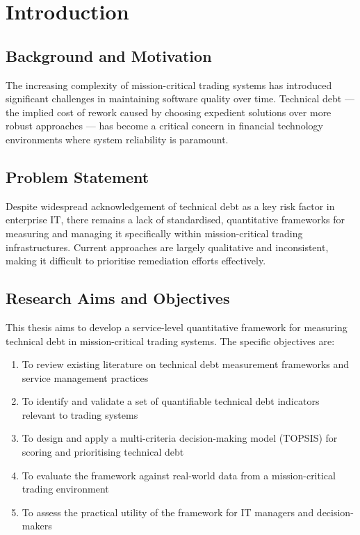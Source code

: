 \documentclass[
  11pt,
  letterpaper,
  11pt,
  english,
  onehalfspacing,
  headsepline]{MastersDoctoralThesis}
\providecommand{\tightlist}{%
  \setlength{\itemsep}{0pt}\setlength{\parskip}{0pt}}
\begin{document}

\chapter{Introduction}\label{introduction}

\section{Background and Motivation}\label{background-and-motivation}

The increasing complexity of mission-critical trading systems has
introduced significant challenges in maintaining software quality over
time. Technical debt --- the implied cost of rework caused by choosing
expedient solutions over more robust approaches --- has become a
critical concern in financial technology environments where system
reliability is paramount.

\section{Problem Statement}\label{problem-statement}

Despite widespread acknowledgement of technical debt as a key risk
factor in enterprise IT, there remains a lack of standardised,
quantitative frameworks for measuring and managing it specifically
within mission-critical trading infrastructures. Current approaches are
largely qualitative and inconsistent, making it difficult to prioritise
remediation efforts effectively.

\section{Research Aims and
Objectives}\label{research-aims-and-objectives}

This thesis aims to develop a service-level quantitative framework for
measuring technical debt in mission-critical trading systems. The
specific objectives are:

\begin{enumerate}
\def\labelenumi{\arabic{enumi}.}
\tightlist
\item
  To review existing literature on technical debt measurement frameworks
  and service management practices
\item
  To identify and validate a set of quantifiable technical debt
  indicators relevant to trading systems
\item
  To design and apply a multi-criteria decision-making model (TOPSIS)
  for scoring and prioritising technical debt
\item
  To evaluate the framework against real-world data from a
  mission-critical trading environment
\item
  To assess the practical utility of the framework for IT managers and
  decision-makers
\end{enumerate}
\end{document}
